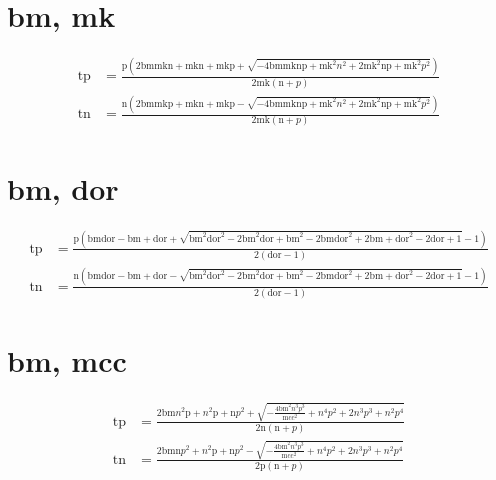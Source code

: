 \documentclass[3p,times]{elsarticle}
\begin{document}
\begin{footnotesize}
\begin{landscape}
\section{bm, mk}
\begin{align}
\mathrm{tp} &= \frac{\mathrm{p} \left(2 \mathrm{bm} \mathrm{mk} \mathrm{n} + \mathrm{mk} \mathrm{n} + \mathrm{mk} \mathrm{p} + \sqrt{- 4 \mathrm{bm} \mathrm{mk} \mathrm{n} \mathrm{p} + \mathrm{mk}^{2} n^{2} + 2 \mathrm{mk}^{2} \mathrm{n} \mathrm{p} + \mathrm{mk}^{2} p^{2}}\right)}{2 \mathrm{mk} \left(\mathrm{n} + p\right)}\\
\mathrm{tn} &= \frac{\mathrm{n} \left(2 \mathrm{bm} \mathrm{mk} \mathrm{p} + \mathrm{mk} \mathrm{n} + \mathrm{mk} \mathrm{p} - \sqrt{- 4 \mathrm{bm} \mathrm{mk} \mathrm{n} \mathrm{p} + \mathrm{mk}^{2} n^{2} + 2 \mathrm{mk}^{2} \mathrm{n} \mathrm{p} + \mathrm{mk}^{2} p^{2}}\right)}{2 \mathrm{mk} \left(\mathrm{n} + p\right)}
\end{align}
\section{bm, dor}
\begin{align}
\mathrm{tp} &= \frac{\mathrm{p} \left(\mathrm{bm} \mathrm{dor} - \mathrm{bm} + \mathrm{dor} + \sqrt{\mathrm{bm}^{2} \mathrm{dor}^{2} - 2 \mathrm{bm}^{2} \mathrm{dor} + \mathrm{bm}^{2} - 2 \mathrm{bm} \mathrm{dor}^{2} + 2 \mathrm{bm} + \mathrm{dor}^{2} - 2 \mathrm{dor} + 1} - 1\right)}{2 \left(\mathrm{dor} - 1\right)}\\
\mathrm{tn} &= \frac{\mathrm{n} \left(\mathrm{bm} \mathrm{dor} - \mathrm{bm} + \mathrm{dor} - \sqrt{\mathrm{bm}^{2} \mathrm{dor}^{2} - 2 \mathrm{bm}^{2} \mathrm{dor} + \mathrm{bm}^{2} - 2 \mathrm{bm} \mathrm{dor}^{2} + 2 \mathrm{bm} + \mathrm{dor}^{2} - 2 \mathrm{dor} + 1} - 1\right)}{2 \left(\mathrm{dor} - 1\right)}
\end{align}
\section{bm, mcc}
\begin{align}
\mathrm{tp} &= \frac{2 \mathrm{bm} n^{2} \mathrm{p} + n^{2} \mathrm{p} + \mathrm{n} p^{2} + \sqrt{- \frac{4 \mathrm{bm}^{2} n^{3} p^{3}}{\mathrm{mcc}^{2}} + n^{4} p^{2} + 2 n^{3} p^{3} + n^{2} p^{4}}}{2 \mathrm{n} \left(\mathrm{n} + p\right)}\\
\mathrm{tn} &= \frac{2 \mathrm{bm} \mathrm{n} p^{2} + n^{2} \mathrm{p} + \mathrm{n} p^{2} - \sqrt{- \frac{4 \mathrm{bm}^{2} n^{3} p^{3}}{\mathrm{mcc}^{2}} + n^{4} p^{2} + 2 n^{3} p^{3} + n^{2} p^{4}}}{2 \mathrm{p} \left(\mathrm{n} + p\right)}
\end{align}

\end{landscape}
\end{footnotesize}
\end{document}
